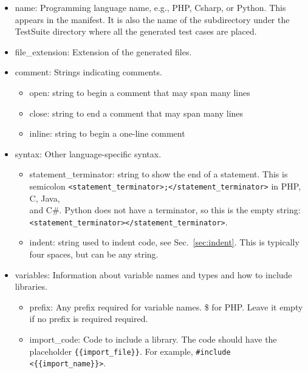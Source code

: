 \documentclass[12pt]{article}
\newcommand{\CSharp}{C{\fontseries{b}\selectfont\#}}
\begin{document}
\begin{itemize}
    \item name: Programming language name, e.g., PHP, Csharp,
    or Python. This appears in the manifest.
    It is also the name of the subdirectory under the TestSuite directory
    where all the generated test cases are placed.

    \item file\_extension: Extension of the generated files.

    \item comment: Strings indicating comments.
    \begin{itemize}
        \item open: string to begin a comment that may span many lines
        \item close: string to end a comment that may span many lines
        \item inline: string to begin a one-line comment
    \end{itemize}
    
    \item syntax: Other language-specific syntax.
    \begin{itemize}
        \item statement\_terminator: string to show the end of 
        a statement.
        This is semicolon
        \verb|<statement_terminator>;</statement_terminator>|
        in PHP, C, Java, \\ and \CSharp. Python does not have 
        a terminator, so this is the empty string: \\
        \verb|<statement_terminator></statement_terminator>|.

        \item indent: string used to indent code, see Sec.~\ref{sec:indent}.
          This is typically four spaces, but
          can be any string.
    \end{itemize}
    
    \item variables: Information about variable names and types and how
    to include libraries.
    \begin{itemize}
        \item prefix: Any prefix required for variable names.
        \$ for PHP.
        Leave it empty if no prefix is required required.

        \item import\_code: Code to include a library. The code
        should have the placeholder \verb|{{import_file}}|.
        For example, \verb|#include <{{import_name}}>|.
        

\end{itemize}
\end{itemize}
\end{document}
